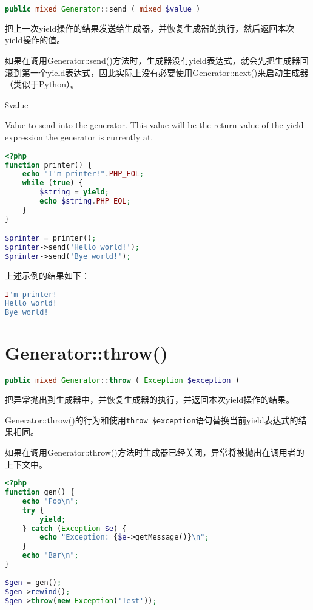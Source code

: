 \begin{lstlisting}[language=PHP]
public mixed Generator::send ( mixed $value )
\end{lstlisting}

把上一次yield操作的结果发送给生成器，并恢复生成器的执行，然后返回本次yield操作的值。

如果在调用Generator::send()方法时，生成器没有yield表达式，就会先把生成器回滚到第一个yield表达式，因此实际上没有必要使用Generator::next()来启动生成器（类似于Python）。

\begin{compactitem}
\item \$value 

Value to send into the generator. This value will be the return value of the yield expression the generator is currently at.
\end{compactitem}



\begin{lstlisting}[language=PHP]
<?php
function printer() {
    echo "I'm printer!".PHP_EOL;
    while (true) {
        $string = yield;
        echo $string.PHP_EOL;
    }
}

$printer = printer();
$printer->send('Hello world!');
$printer->send('Bye world!');
\end{lstlisting}

上述示例的结果如下：

\begin{lstlisting}[language=PHP]
I'm printer!
Hello world!
Bye world!
\end{lstlisting}


\section{Generator::throw()}




\begin{lstlisting}[language=PHP]
public mixed Generator::throw ( Exception $exception )
\end{lstlisting}

把异常抛出到生成器中，并恢复生成器的执行，并返回本次yield操作的结果。

Generator::throw()的行为和使用\texttt{throw \$exception}语句替换当前yield表达式的结果相同。

如果在调用Generator::throw()方法时生成器已经关闭，异常将被抛出在调用者的上下文中。


\begin{lstlisting}[language=PHP]
<?php
function gen() {
    echo "Foo\n";
    try {
        yield;
    } catch (Exception $e) {
        echo "Exception: {$e->getMessage()}\n";
    }
    echo "Bar\n";
}
 
$gen = gen();
$gen->rewind();
$gen->throw(new Exception('Test'));
\end{lstlisting}


